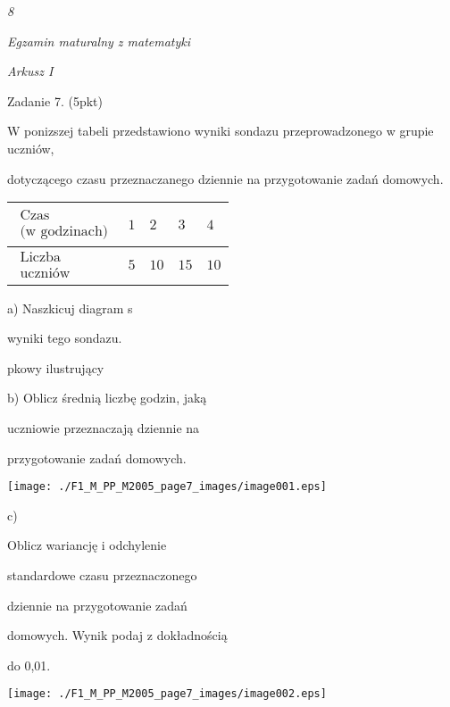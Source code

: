 \documentclass[a4paper,12pt]{article}
\begin{document}
{\it 8}

{\it Egzamin maturalny z matematyki}

{\it Arkusz I}

Zadanie 7. (5pkt)

W ponizszej tabeli przedstawiono wyniki sondazu przeprowadzonego w grupie uczniów,

dotyczącego czasu przeznaczanego dziennie na przygotowanie zadań domowych.
\begin{center}
\begin{tabular}{|l|l|l|l|l|}
\hline
\multicolumn{1}{|l|}{$\begin{array}{l}\mbox{Czas}	\\	\mbox{(w godzinach)}	\end{array}$}&	\multicolumn{1}{|l|}{ $1$}&	\multicolumn{1}{|l|}{ $2$}&	\multicolumn{1}{|l|}{ $3$}&	\multicolumn{1}{|l|}{ $4$}	\\
\hline
\multicolumn{1}{|l|}{$\begin{array}{l}\mbox{Liczba}	\\	\mbox{uczniów}	\end{array}$}&	\multicolumn{1}{|l|}{ $5$}&	\multicolumn{1}{|l|}{ $10$}&	\multicolumn{1}{|l|}{ $15$}&	\multicolumn{1}{|l|}{ $10$}	\\
\hline
\end{tabular}

\end{center}
a) Naszkicuj diagram s

wyniki tego sondazu.

pkowy ilustrujący

b) Oblicz średnią liczbę godzin, jaką

uczniowie przeznaczają dziennie na

przygotowanie zadań domowych.
\begin{center}
\texttt{[image: ./F1\_M\_PP\_M2005\_page7\_images/image001.eps]}
\end{center}
c)

Oblicz wariancję i odchylenie

standardowe czasu przeznaczonego

dziennie na przygotowanie zadań

domowych. Wynik podaj z dokładnością

do 0,01.
\begin{center}
\texttt{[image: ./F1\_M\_PP\_M2005\_page7\_images/image002.eps]}
\end{center}
\end{document}
